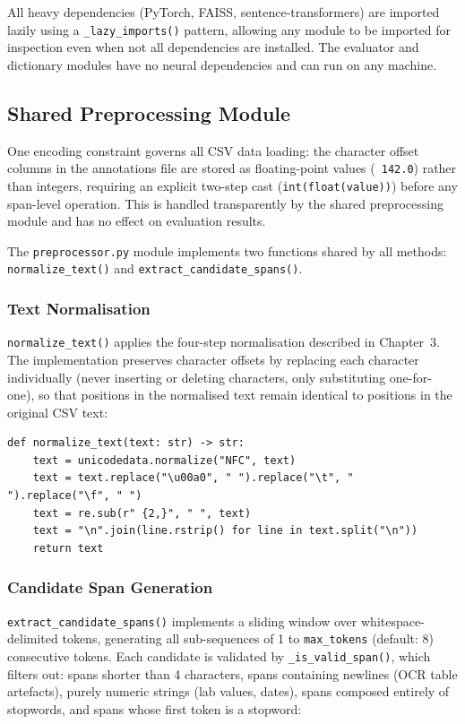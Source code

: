All heavy dependencies (PyTorch, FAISS, sentence-transformers) are imported lazily using a \texttt{\_lazy\_imports()} pattern, allowing any module to be imported for inspection even when not all dependencies are installed. The evaluator and dictionary modules have no neural dependencies and can run on any machine.

\subsection{Shared Preprocessing Module}

One encoding constraint governs all CSV data loading: the character offset columns in the annotations file are stored as floating-point values (\eg\ \texttt{142.0}) rather than integers, requiring an explicit two-step cast (\texttt{int(float(value))}) before any span-level operation. This is handled transparently by the shared preprocessing module and has no effect on evaluation results.

The \texttt{preprocessor.py} module implements two functions shared by all methods: \texttt{normalize\_text()} and \texttt{extract\_candidate\_spans()}.

\subsubsection{Text Normalisation}

\texttt{normalize\_text()} applies the four-step normalisation described in Chapter~3. The implementation preserves character offsets by replacing each character individually (never inserting or deleting characters, only substituting one-for-one), so that positions in the normalised text remain identical to positions in the original CSV text:

\begin{verbatim}
def normalize_text(text: str) -> str:
    text = unicodedata.normalize("NFC", text)
    text = text.replace("\u00a0", " ").replace("\t", " ").replace("\f", " ")
    text = re.sub(r" {2,}", " ", text)
    text = "\n".join(line.rstrip() for line in text.split("\n"))
    return text
\end{verbatim}

\subsubsection{Candidate Span Generation}

\texttt{extract\_candidate\_spans()} implements a sliding window over whitespace-delimited tokens, generating all sub-sequences of 1 to \texttt{max\_tokens} (default: 8) consecutive tokens. Each candidate is validated by \texttt{\_is\_valid\_span()}, which filters out: spans shorter than 4 characters, spans containing newlines (OCR table artefacts), purely numeric strings (lab values, dates), spans composed entirely of stopwords, and spans whose first token is a stopword:

